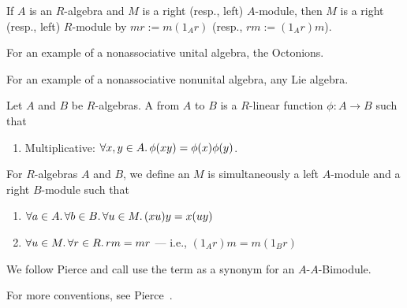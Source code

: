 \begin{node}
If $A$ is an $R$-algebra and $M$ is a right (resp., left) $A$-module, 
then $M$ is a right (resp., left) $R$-module by $mr:=m(1_{A}r)$
(resp., $rm:=(1_{A}r)m$).
\end{node}

\begin{remark}
For an example of a nonassociative unital algebra, the Octonions.

For an example of a nonassociative nonunital algebra, any Lie algebra.
\end{remark}

\begin{definition}
Let $A$ and $B$ be $R$-algebras. A 
from $A$ to $B$ is a $R$-linear function $\phi\colon A\to B$ such that
\begin{enumerate}
\item Multiplicative: $\forall x,y\in A\ldotp\phi(xy)=\phi(x)\phi(y)$.
\end{enumerate}
\end{definition}

\begin{definition}
For $R$-algebras $A$ and $B$, we define an 
$M$ is simultaneously a left $A$-module and a right $B$-module such
that
\begin{enumerate}
\item $\forall a\in A\ldotp\forall b\in B\ldotp\forall u\in M\ldotp (xu)y=x(uy)$
\item $\forall u\in M\ldotp\forall r\in R\ldotp rm=mr$ --- i.e., $(1_{A}r)m=m(1_{B}r)$
\end{enumerate}
We follow Pierce and call use the term  as a
synonym for an $A$-$A$-Bimodule.
\end{definition}

\begin{node}
For more conventions, see Pierce~\cite[\S1.1]{pierce1982associative}.
\end{node}

